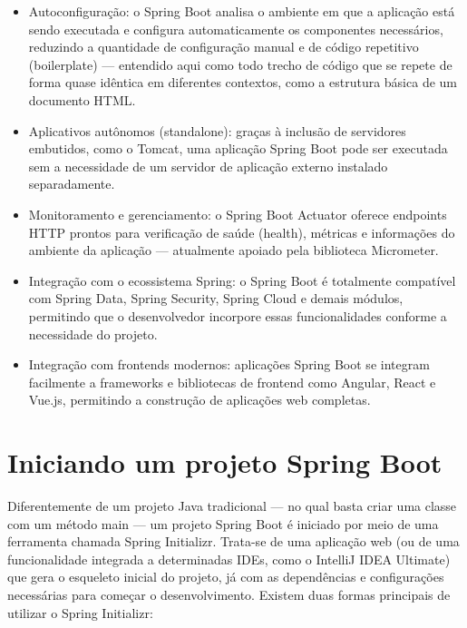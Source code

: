 \begin{itemize}
  \item Autoconfiguração: o Spring Boot analisa o ambiente em que a aplicação está sendo executada e configura automaticamente os componentes necessários, reduzindo a quantidade de configuração manual e de código repetitivo (boilerplate) — entendido aqui como todo trecho de código que se repete de forma quase idêntica em diferentes contextos, como a estrutura básica de um documento HTML.
\end{itemize}

\begin{itemize}
  \item Aplicativos autônomos (standalone): graças à inclusão de servidores embutidos, como o Tomcat, uma aplicação Spring Boot pode ser executada sem a necessidade de um servidor de aplicação externo instalado separadamente.
\end{itemize}

\begin{itemize}
  \item Monitoramento e gerenciamento: o Spring Boot Actuator oferece endpoints HTTP prontos para verificação de saúde (health), métricas e informações do ambiente da aplicação — atualmente apoiado pela biblioteca Micrometer.
\end{itemize}

\begin{itemize}
  \item Integração com o ecossistema Spring: o Spring Boot é totalmente compatível com Spring Data, Spring Security, Spring Cloud e demais módulos, permitindo que o desenvolvedor incorpore essas funcionalidades conforme a necessidade do projeto.
\end{itemize}

\begin{itemize}
  \item Integração com frontends modernos: aplicações Spring Boot se integram facilmente a frameworks e bibliotecas de frontend como Angular, React e Vue.js, permitindo a construção de aplicações web completas.
\end{itemize}

\section{Iniciando um projeto Spring Boot}

Diferentemente de um projeto Java tradicional — no qual basta criar uma classe com um método main — um projeto Spring Boot é iniciado por meio de uma ferramenta chamada Spring Initializr. Trata-se de uma aplicação web (ou de uma funcionalidade integrada a determinadas IDEs, como o IntelliJ IDEA Ultimate) que gera o esqueleto inicial do projeto, já com as dependências e configurações necessárias para começar o desenvolvimento. Existem duas formas principais de utilizar o Spring Initializr:

